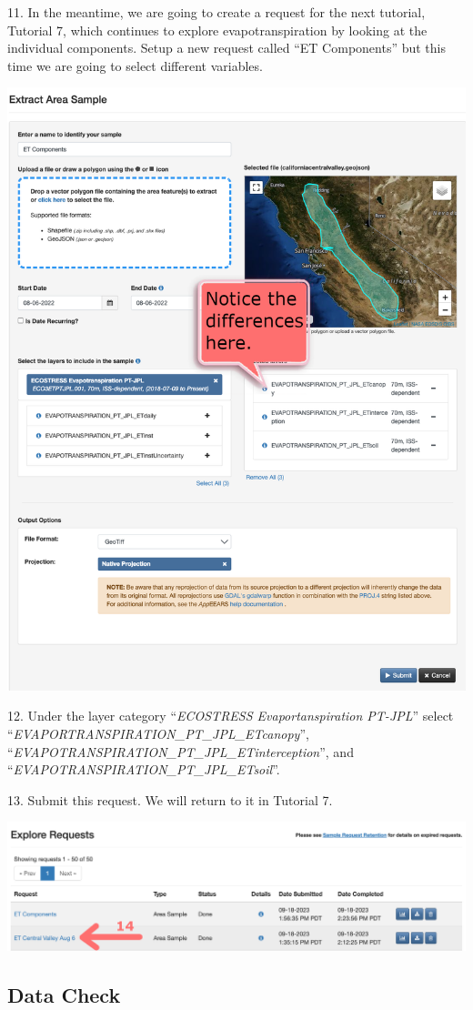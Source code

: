 \documentclass[oneside,a4paper,11pt,explicit]{book}
\begin{document}
11. In the meantime, we are going to create a request for the next tutorial, Tutorial 7, which continues to explore evapotranspiration by looking at the individual components. Setup a new request called ``ET Components'' but this time we are going to select different variables. 

\vspace{.5em}

\centerline{\includegraphics[width=.6\textwidth]{ETcomponentRequest.png}}

\vspace{.5em}

12. Under the layer category ``\textit{ECOSTRESS Evaportanspiration PT-JPL}'' select ``\textit{EVAPORTRANSPIRATION\_PT\_JPL\_ETcanopy}'', ``\textit{EVAPOTRANSPIRATION\_PT\_JPL\_ETinterception}'', and ``\textit{EVAPOTRANSPIRATION\_PT\_JPL\_ETsoil}''.

13. Submit this request. We will return to it in Tutorial 7.

\vspace{.5em}

\centerline{\includegraphics[width=.6\textwidth]{ExploreComplete.png}}

\vspace{.5em}

\subsection{Data Check}
\end{document}
